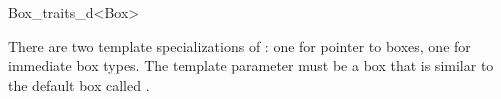 
\ccRefPageBegin
\begin{ccRefClass}{Box_traits_d<Box>}

\ccDefinition
There are two template specializations of : one for pointer
to boxes, one for immediate box types. The template parameter must be a box that
is similar to the default box called .


\ccIsModel
{}



\end{ccRefClass}


\ccRefPageEnd
